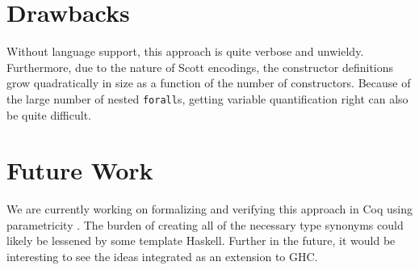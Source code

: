 \documentclass[]{article}
\begin{document}
\section{Drawbacks}\label{drawbacks}

Without language support, this approach is quite verbose and unwieldy.
Furthermore, due to the nature of Scott encodings, the constructor
definitions grow quadratically in size as a function of the number of
constructors. Because of the large number of nested \texttt{forall}s,
getting variable quantification right can also be quite difficult.

\section{Future Work}\label{future-work}

We are currently working on formalizing and verifying this approach in
Coq using parametricity \cite{parametricity}. The burden of creating all
of the necessary type synonyms could likely be lessened by some template
Haskell. Further in the future, it would be interesting to see the ideas
integrated as an extension to GHC.
\end{document}
